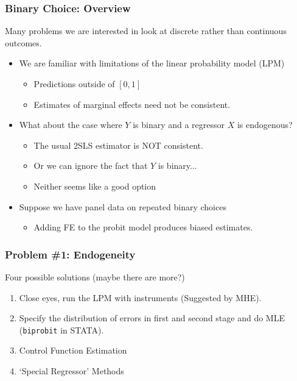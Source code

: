 \documentclass[aspectratio=169]{beamer}
\begin{document}
\begin{frame}
\frametitle{Binary Choice: Overview}
Many problems we are interested in look at discrete rather than continuous outcomes.
\begin{itemize}
\item We are familiar with limitations of the linear probability model (LPM)
\begin{itemize}
\item Predictions outside of $[0,1]$
\item Estimates of marginal effects need not be consistent.
\end{itemize}
\item What about the case where $Y$ is binary and a regressor $X$ is endogenous?
\begin{itemize}
\item The usual 2SLS estimator is \alert{NOT consistent}.
\item Or we can ignore the fact that $Y$ is binary...
\item Neither seems like a good option
\end{itemize}
\item Suppose we have panel data on repeated binary choices
\begin{itemize}
\item Adding FE to the probit model produces biased estimates.
\end{itemize}
\end{itemize}
\end{frame}
\begin{frame}
\frametitle{Problem \#1: Endogeneity}
Four possible solutions (maybe there are more?)
\begin{enumerate}
\item Close eyes, run the LPM with instruments (Suggested by MHE).
\item Specify the distribution of errors in first and second stage and do MLE (\texttt{biprobit} in STATA).
\item Control Function Estimation
\item `Special Regressor' Methods
\end{enumerate}
\end{frame}
\end{document}
